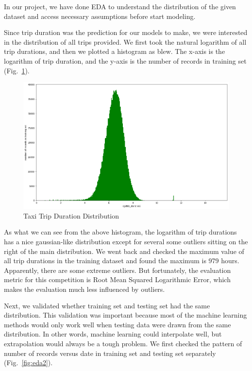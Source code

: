 In our project, we have done EDA to understand the distribution of the given dataset and access necessary assumptions before start modeling. 

Since trip duration was the prediction for our models to make, we were interested in the distribution of all trips provided. We first took the natural logarithm of all trip durations, and then we plotted a histogram as blew. The x-axis is the logarithm of trip duration, and the y-axis is the number of records in training set (Fig.~\ref{fig:eda1}). 

\begin{figure}
	\centering
	\includegraphics[width=\linewidth]{eda1.png}
	\caption{Taxi Trip Duration Distribution}
	\label{fig:eda1}
\end{figure}

As what we can see from the above histogram, the logarithm of trip durations has a nice gaussian-like distribution except for several some outliers sitting on the right of the main distribution. We went back and checked the maximum value of all trip durations in the training dataset and found the maximum is 979 hours. Apparently, there are some extreme outliers. But fortunately, the evaluation metric for this competition is Root Mean Squared Logarithmic Error, which makes the evaluation much less influenced by outliers. 

Next, we validated whether training set and testing set had the same distribution. This validation was important because most of the machine learning methods would only work well when testing data were drawn from the same distribution. In other words, machine learning could interpolate well, but extrapolation would always be a tough problem. We first checked the pattern of number of records versus date in training set and testing set separately (Fig.~\ref{fig:eda2}). 

